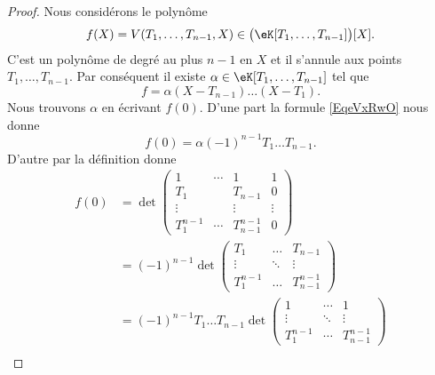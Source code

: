 \begin{proof}
    Nous considérons le polynôme
    \begin{equation}
        f(X)=V(T_1,\ldots, T_{n-1},X)\in \big( \eK[T_1,\ldots, T_{n-1}] \big)[X].
    \end{equation}
    C'est un polynôme de degré au plus \( n-1\) en \( X\) et il s'annule aux points \( T_1,\ldots, T_{n-1}\). Par conséquent il existe \( \alpha\in \eK[T_1,\ldots, T_{n-1}]\) tel que
    \begin{equation}    \label{EqeVxRwO}
        f=\alpha(X-T_{n-1})\ldots(X-T_1).
    \end{equation}
    Nous trouvons \( \alpha\) en écrivant \( f(0)\). D'une part la formule \eqref{EqeVxRwO} nous donne
    \begin{equation}    \label{EqblwWMj}
        f(0)=\alpha(-1)^{n-1}T_1\ldots T_{n-1}.
    \end{equation}
    D'autre par la définition donne
    \begin{subequations}
        \begin{align}
            f(0)&=\det\begin{pmatrix}
                 1   &   \cdots    &   1    &   1    \\
                 T_1      &       &   T_{n-1}    &   0    \\
                 \vdots   &       &   \vdots    &   \vdots    \\
                 T_1^{n-1}   &   \cdots    &   T_{n-1}^{n-1}    &   0
             \end{pmatrix}\\
             &=(-1)^{n-1}\det\begin{pmatrix}
                 T_1   &   \ldots    &   T_{n-1}    \\
                 \vdots   &   \ddots    &   \vdots    \\
                 T_1^{n-1}   &   \ldots    &   T_{n-1}^{n-1}
             \end{pmatrix}\\
             &=(-1)^{n-1}T_1\ldots T_{n-1}\det\begin{pmatrix}
                 1   &   \cdots    &   1    \\
                 \vdots   &   \ddots    &   \vdots    \\
                 T_1^{n-1}   &   \cdots    &   T_{n-1}^{n-1}
             \end{pmatrix}\\

\end{align}
\end{subequations}
\end{proof}
